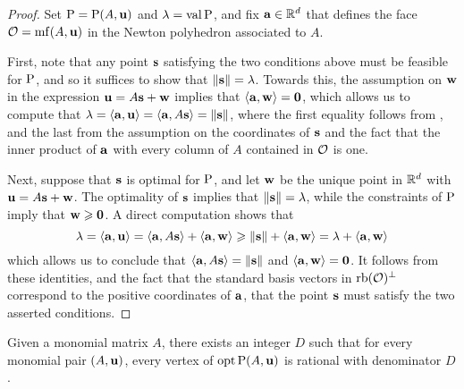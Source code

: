 \documentclass[11pt]{amsart}
\begin{document}
\begin{proof}  
Set $\mathrm{P} = \mathrm{P}(A, \mathbf{u})$ and $\lambda = \operatorname{val} \mathrm{P}$, and fix $\mathbf{a} \in \mathbb{R}^d$ that defines the face $\mathcal{O} = \operatorname{mf}(A, \mathbf{u})$ in the Newton polyhedron associated to $A$. 

First, note that any point $\mathbf{s}$ satisfying the two conditions above must be feasible for $\mathrm{P}$, and so it suffices to show that $\| \mathbf{s} \| = \lambda$.  Towards this, the assumption on $\mathbf{w}$ in the expression $\mathbf{u} = A \mathbf{s} + \mathbf{w}$ implies that $\langle \mathbf{a}, \mathbf{w} \rangle = \mathbf{0}$, which allows us to compute that $\lambda = \langle \mathbf{a}, \mathbf{u} \rangle = \langle \mathbf{a}, A\mathbf{s} \rangle = \| \mathbf{s} \|$, where the first equality follows from 
, and the last from the assumption on the coordinates of $\mathbf{s}$ and the fact that the inner product of $\mathbf{a}$ with every column of $A$ contained in $\mathcal{O}$ is one.

Next, suppose that $\mathbf{s}$ is optimal for $\mathrm{P}$, and let $\mathbf{w}$ be the unique point in $\mathbb{R}^d$ with $\mathbf{u} = A \mathbf{s} + \mathbf{w}$.  The optimality of $\mathbf{s}$ implies that $\| \mathbf{s} \| = \lambda$, while the constraints of $\mathrm{P}$ imply that $\mathbf{w} \geqslant \mathbf{0}$.  A direct computation shows that
%
\[ \lambda = \langle \mathbf{a}, \mathbf{u} \rangle = \langle \mathbf{a}, A \mathbf{s} \rangle + \langle \mathbf{a}, \mathbf{w} \rangle \geqslant \| \mathbf{s} \| + \langle \mathbf{a}, \mathbf{w} \rangle = \lambda + \langle \mathbf{a}, \mathbf{w} \rangle \]
%
which allows us to conclude that $\langle \mathbf{a}, A \mathbf{s} \rangle = \| \mathbf{s} \|$ and $\langle \mathbf{a}, \mathbf{w} \rangle = \mathbf{0}$.  It follows from these identities, and the fact that the standard basis vectors in $\operatorname{rb}(\mathcal{O})^{\perp}$ correspond to the positive coordinates of $\mathbf{a}$, that the point $\mathbf{s}$ must satisfy the two asserted conditions.
\end{proof}



\begin{theorem}  
\label{uniform denominators for vertices:  T}
Given a monomial matrix $A$, there exists an integer $D$ such that for every monomial pair $(A, \mathbf{u})$, every vertex of $\operatorname{opt} \mathrm{P}(A, \mathbf{u})$ is rational with denominator $D$.
\end{theorem}
\end{document}

